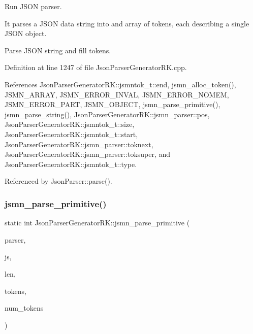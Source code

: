Run J\+S\+ON parser. 

It parses a J\+S\+ON data string into and array of tokens, each describing a single J\+S\+ON object.

Parse J\+S\+ON string and fill tokens. 

Definition at line 1247 of file Json\+Parser\+Generator\+R\+K.\+cpp.



References Json\+Parser\+Generator\+R\+K\+::jsmntok\+\_\+t\+::end, jsmn\+\_\+alloc\+\_\+token(), J\+S\+M\+N\+\_\+\+A\+R\+R\+AY, J\+S\+M\+N\+\_\+\+E\+R\+R\+O\+R\+\_\+\+I\+N\+V\+AL, J\+S\+M\+N\+\_\+\+E\+R\+R\+O\+R\+\_\+\+N\+O\+M\+EM, J\+S\+M\+N\+\_\+\+E\+R\+R\+O\+R\+\_\+\+P\+A\+RT, J\+S\+M\+N\+\_\+\+O\+B\+J\+E\+CT, jsmn\+\_\+parse\+\_\+primitive(), jsmn\+\_\+parse\+\_\+string(), Json\+Parser\+Generator\+R\+K\+::jsmn\+\_\+parser\+::pos, Json\+Parser\+Generator\+R\+K\+::jsmntok\+\_\+t\+::size, Json\+Parser\+Generator\+R\+K\+::jsmntok\+\_\+t\+::start, Json\+Parser\+Generator\+R\+K\+::jsmn\+\_\+parser\+::toknext, Json\+Parser\+Generator\+R\+K\+::jsmn\+\_\+parser\+::toksuper, and Json\+Parser\+Generator\+R\+K\+::jsmntok\+\_\+t\+::type.



Referenced by Json\+Parser\+::parse().

\mbox{\label{namespace_json_parser_generator_r_k_aee5a37badfbb7bed92ca662a733fde8f}} 
\subsubsection{\texorpdfstring{jsmn\+\_\+parse\+\_\+primitive()}{jsmn\_parse\_primitive()}}
{\footnotesize\ttfamily static int Json\+Parser\+Generator\+R\+K\+::jsmn\+\_\+parse\+\_\+primitive (\begin{DoxyParamCaption}\item[{\hyperlink{struct_json_parser_generator_r_k_1_1jsmn__parser}{jsmn\+\_\+parser} $\ast$}]{parser,  }\item[{const char $\ast$}]{js,  }\item[{size\+\_\+t}]{len,  }\item[{\hyperlink{struct_json_parser_generator_r_k_1_1jsmntok__t}{jsmntok\+\_\+t} $\ast$}]{tokens,  }\item[{size\+\_\+t}]{num\+\_\+tokens }\end{DoxyParamCaption})\hspace{0.3cm}{\ttfamily [static]}}

